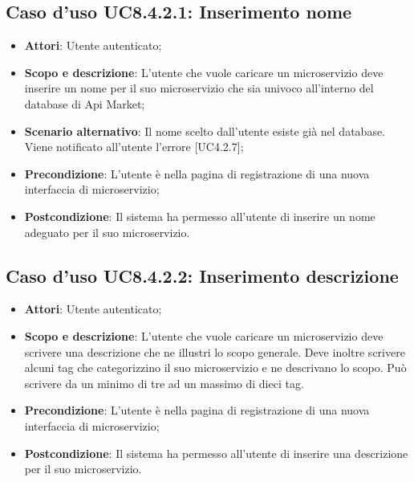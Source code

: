 \documentclass[12pt,a4paper,titlepage]{article}
\begin{document}
	\subsection{Caso d'uso UC8.4.2.1: Inserimento nome}
	\label{UC8.4.2.1}
	\begin{itemize}
		\item \textbf{Attori}: Utente autenticato;
		\item \textbf{Scopo e descrizione}: L'utente che vuole caricare un microservizio deve inserire un nome per il suo microservizio che sia univoco all'interno del database di Api Market;
		\item \textbf{Scenario alternativo}: Il nome scelto dall'utente esiste già nel database. Viene notificato all'utente l'errore [UC4.2.7];
		\item \textbf{Precondizione}: L'utente è nella pagina di registrazione di una nuova interfaccia di microservizio;
		\item \textbf{Postcondizione}: Il sistema ha permesso all'utente di inserire un nome adeguato per il suo microservizio.
	\end{itemize}
	\subsection{Caso d'uso UC8.4.2.2: Inserimento descrizione}
	\label{UC8.4.2.2}
	\begin{itemize}
		\item \textbf{Attori}: Utente autenticato;
		\item \textbf{Scopo e descrizione}: L'utente che vuole caricare un microservizio deve scrivere una descrizione che ne illustri lo scopo generale. Deve inoltre scrivere alcuni tag che categorizzino il suo microservizio e ne descrivano lo scopo. Può scrivere da un minimo di tre ad un massimo di dieci tag.
		\item \textbf{Precondizione}: L'utente è nella pagina di registrazione di una nuova interfaccia di microservizio;
		\item \textbf{Postcondizione}: Il sistema ha permesso all'utente di inserire una descrizione per il suo microservizio.
	\end{itemize}
\end{document}
